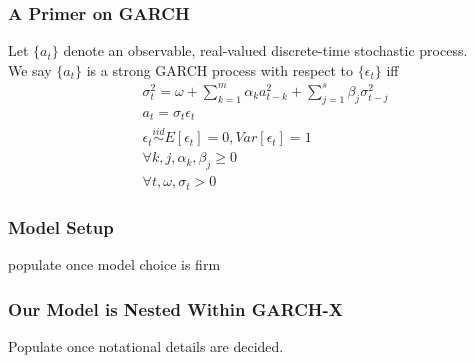 \documentclass{beamer}
\newcommand{\simiid}{\stackrel{iid}{\sim}} %
\theoremstyle{definition}
\begin{document}
\begin{frame}
    \frametitle{A Primer on GARCH}

    Let $\{a_{t}\}$ denote an observable, real-valued discrete-time stochastic process.\\
    

    We say $\{a_{t}\}$ is a strong GARCH process with respect to $\{\epsilon_{t}\}$ iff 
    \begin{align*}
        &\sigma_{t}^{2} = \omega + \sum^{m}_{k=1}\alpha_{k}a^{2}_{t-k} + \sum_{j=1}^{s}\beta_{j}\sigma_{t-j}^{2}\\
        &a_{t} = \sigma_{t}\epsilon_{t}\\
        &\epsilon_{t} \simiid E[\epsilon_{t}]=0, Var[\epsilon_{t}] = 1\\
        &\forall k,j, \alpha_{k},\beta_{j}\geq 0\\ 
        &\forall t, \omega, \sigma_{t} > 0 
        \end{align*}
\end{frame}

\begin{frame}
\frametitle{Model Setup}
populate once model choice is firm
\end{frame}

\begin{frame}
\frametitle{Our Model is Nested Within GARCH-X}

Populate once notational details are decided.

\end{frame}
\end{document}
